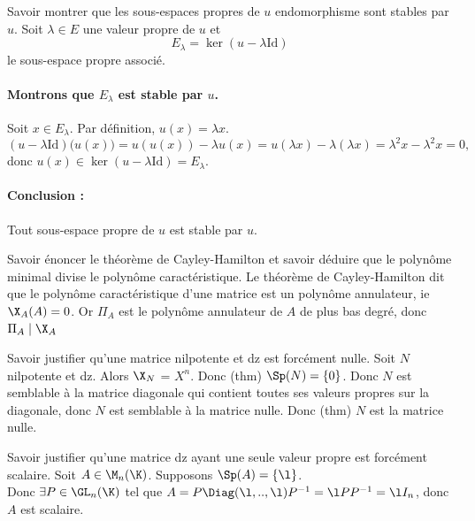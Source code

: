 \documentclass[french, 11pt]{article}
\begin{document}
\begin{exercice}{}{}
    Savoir montrer que les sous-espaces propres de $u$ endomorphisme sont stables par $u$.
    \tcblower
    Soit \(\lambda \in E\) une valeur propre de \(u\) et  
    \[
    E_\lambda = \ker(u - \lambda\mathrm{Id})
    \]
    le sous-espace propre associé.

    \paragraph{Montrons que \(E_\lambda\) est stable par \(u\).}  

    Soit \(x \in E_\lambda\). Par définition, \(u(x) = \lambda x\).\\
    \[
    (u - \lambda\mathrm{Id})\big(u(x)\big) = u(u(x)) - \lambda u(x) 
    = u(\lambda x) - \lambda(\lambda x) 
    = \lambda^2 x - \lambda^2 x = 0,
    \]
    donc \(u(x) \in \ker(u - \lambda\mathrm{Id}) = E_\lambda\).

    \paragraph{Conclusion :} Tout sous-espace propre de \(u\) est stable par \(u\).
\end{exercice}

\begin{exercice}{}{}
    Savoir énoncer le théorème de Cayley-Hamilton et savoir déduire que le polynôme minimal divise le polynôme caractéristique.
    \tcblower
    Le théorème de Cayley-Hamilton dit que le polynôme caractéristique d'une matrice est un polynôme annulateur, ie $\X_A(A) = 0$. Or $\Pi_A$ est le polynôme annulateur de $A$ de plus bas degré, donc $\Pi_A \mid \X_A$
\end{exercice}

\begin{exercice}{}{}
    Savoir justifier qu'une matrice nilpotente et dz est forcément nulle.
    \tcblower
    Soit $N$ nilpotente et dz. Alors $\X_N$ = $X^n$. Donc (thm) $\Sp(N) = \{0\}$. Donc $N$ est semblable à la matrice diagonale qui contient toutes ses valeurs propres sur la diagonale, donc $N$ est semblable à la matrice nulle. Donc (thm) $N$ est la matrice nulle.
\end{exercice}

\begin{exercice}{}{}
    Savoir justifier qu'une matrice dz ayant une seule valeur propre est forcément scalaire.
    \tcblower
    Soit $A \in \M_n(\K)$. Supposons $\Sp(A) = \{\l\}$.\\
    Donc $\exists P \in \GL_n(\K)$ tel que $A = P \Diag(\l,..,\l)P^{-1} = \l PP^{-1} = \l I_n$, donc $A$ est scalaire.
\end{exercice}
\end{document}
